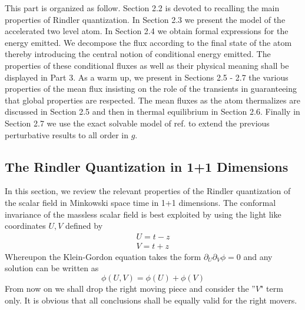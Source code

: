 This part is organized as follow. Section 2.2 is devoted to recalling
the main properties of Rindler quantization. In Section 2.3 we present the
model of the accelerated two level atom. In Section 2.4  we obtain formal
expressions for the energy emitted.
We decompose the flux according to the
final state of the atom thereby introducing the central notion of conditional
energy emitted.  The
properties of these conditional fluxes
as well as their physical meaning shall be displayed in Part 3.
As a warm up,
we present in Sections 2.5 - 2.7
the various properties of the mean flux
 insisting on the role of the transients  in guaranteeing that
global properties are respected.
The mean fluxes as the atom thermalizes are discussed in Section 2.5 and then
in thermal equilibrium in Section 2.6. Finally in Section 2.7 we use the exact
solvable model of ref. \cite{RSG} to extend the previous perturbative
results to all order
in $g$.


\subsection{The Rindler Quantization in 1+1 Dimensions}

In this section, we review the relevant properties of the Rindler
quantization of the scalar field in Minkowski space time in 1+1 dimensions.
The conformal invariance of the massless scalar field is best
exploited by using the light like coordinates $U,V$ defined by
\begin{eqnarray}
U=t-z
\nonumber\\
V=t+z
\label{UV}
\end{eqnarray}
Whereupon the Klein-Gordon equation takes the form $\partial_U\partial_V \phi
= 0$ and any solution can be written as
\begin{equation} \phi(U,V) = \phi(U) + \phi(V) \label{threethreei}
\end{equation} From now on we shall drop the right moving piece and consider
the ''$V$" term only. It is
obvious that all conclusions shall be equally valid
for
the
right
movers.


